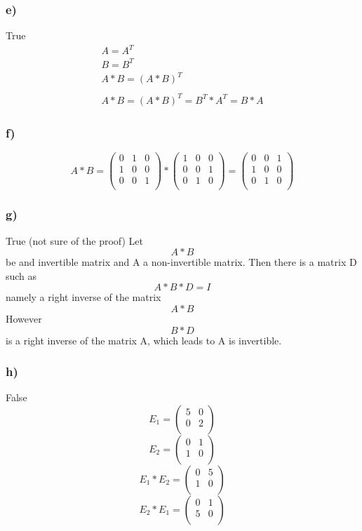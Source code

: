 \documentclass[10pt,a4paper]{article}
\begin{document}
\subsubsection*{e)}
 True
\begin{gather*}
A=A^{T}\\
B=B^{T}\\
A*B=(A*B)^{T}\\
\\
A*B=(A*B)^{T}=B^T*A^T=B*A
\end{gather*}

\subsubsection*{f)}
\[
A*B = \left( \begin{array}{ccc}
    0 & 1 & 0 \\
    1 & 0 & 0 \\
    0 & 0 & 1 \\
  \end{array} \right) * \left( \begin{array}{ccc}
    1 & 0 & 0 \\
    0 & 0 & 1 \\
    0 & 1 & 0 \\
  \end{array} \right) = \left( \begin{array}{ccc}
    0 & 0 & 1 \\
    1 & 0 & 0 \\
    0 & 1 & 0 \\
 \end{array} \right) 
 \]

\subsubsection*{g)}
True (not sure of the proof)
Let \[A*B\] be and invertible matrix and A a non-invertible matrix. Then there is a matrix D such  as \[A*B*D=I\] namely a right inverse of the matrix \[A*B\] However \[B*D\] is a right inverse of the matrix  A, which leads to A is invertible.

\subsubsection*{h)}
 False
\[
E_1=\left( \begin{array}{cc}
    5 & 0\\
    0 & 2\\
\end{array}\right)
\]
\[
E_2=\left( \begin{array}{cc}
    0 & 1\\
    1 & 0\\
\end{array}\right)
\]
\[
E_1*E_2=\left( \begin{array}{cc}
    0 & 5\\
    1 & 0\\
\end{array}\right)
\]
\[
E_2*E_1=\left( \begin{array}{cc}
    0 & 1\\
    5 & 0\\
\end{array}\right)
\]
\end{document}
